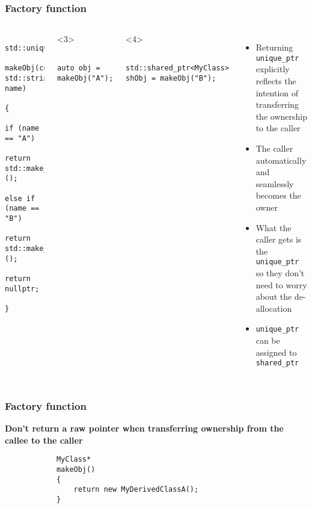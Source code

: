 \documentclass{beamer}
\begin{document}
\begin{frame}[fragile,t]
\frametitle{Factory function}
	\begin{columns}[t]
		\begin{lstlisting}
			std::unique_ptr<MyClass> 
			makeObj(const std::string& name)
			{
				if (name == "A")
					return std::make_unique<MyDerivedClassA>();
				else if (name == "B")
					return std::make_unique<MyDerivedClassB>();
				return nullptr;
			}
		\end{lstlisting}
        \hrulefill
		\begin{onlyenv}<3>
		\begin{lstlisting}
			auto obj = makeObj("A");
		\end{lstlisting}
		\end{onlyenv}
		\begin{onlyenv}<4>
		\begin{lstlisting}
			std::shared_ptr<MyClass> shObj = makeObj("B");
		\end{lstlisting}
		\end{onlyenv}
		\begin{itemize}
			\item<2-> Returning \texttt{unique\_ptr} explicitly reflects the intention of
				  transferring the ownership to the caller
			\item<3-> The caller automatically and seamlessly becomes the owner
			\item<3-> What the caller gets is the \texttt{unique\_ptr} so they 
					 don't need to worry about the de-allocation
			\item<4-> \texttt{unique\_ptr} can be assigned to \texttt{shared\_ptr}
		\end{itemize}
	\end{columns}
\end{frame}

\begin{frame}[fragile]
\frametitle{Factory function}
	\textbf{Don't return a raw pointer when transferring ownership from the callee to
			the caller}
	\begin{example}
		\begin{lstlisting}
			MyClass* 
			makeObj()
			{
				return new MyDerivedClassA();
			}
		\end{lstlisting}
	\end{example}
\end{frame}
\end{document}
